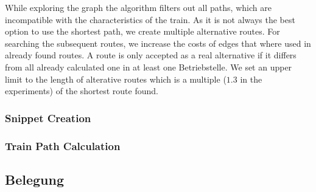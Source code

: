 While exploring the graph the algorithm filters out all paths, which are incompatible with the characteristics of the train.
As it is not always the best option to use the shortest path, we create multiple alternative routes. For searching the subsequent routes, we increase the costs of edges that where used in already found routes. A route is only accepted as a real alternative if it differs from all already calculated one in at least one Betriebstelle. We set an upper limit to the length of alterative routes which is a multiple ($1.3$ in the experiments) of the shortest route found.


\subsubsection{Snippet Creation}


\subsubsection{Train Path Calculation}


\subsection{Belegung}
\label{chap:Belegung}